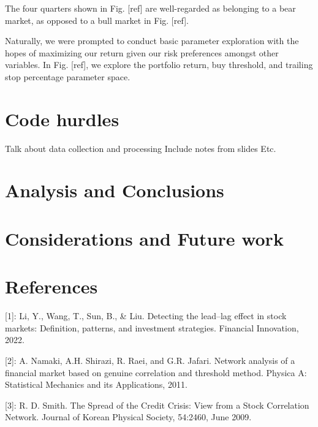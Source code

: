 \documentclass{article}
\begin{document}
The four quarters shown in Fig. [ref] are well-regarded as belonging to a bear market, as opposed to a bull market in Fig. [ref].

Naturally, we were prompted to conduct basic parameter exploration with the hopes of maximizing our return given our risk preferences amongst other variables. In Fig. [ref], we explore the portfolio return, buy threshold, and trailing stop percentage parameter space.
\section{Code hurdles}
Talk about data collection and processing
Include notes from slides
Etc.
\section{Analysis and Conclusions}
\section{Considerations and Future work}
\section*{References}
[1]: Li, Y., Wang, T., Sun, B., \& Liu. Detecting the lead–lag effect in stock markets: Definition, patterns, and investment strategies. Financial Innovation, 2022.

[2]: A. Namaki, A.H. Shirazi, R. Raei, and G.R. Jafari. Network analysis of a financial market based on genuine correlation and threshold method. Physica A: Statistical
Mechanics and its Applications, 2011.

[3]: R. D. Smith. The Spread of the Credit Crisis: View
from a Stock Correlation Network. Journal of Korean
Physical Society, 54:2460, June 2009.

\medskip



\small

\end{document}
